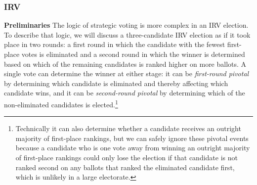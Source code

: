 \documentclass[11pt,a4paper]{article}
\begin{document}
%
%
%
%

\subsubsection{IRV} 

\noindent \textbf{Preliminaries}  The logic of strategic voting is more complex in an IRV election. To describe that logic, we will discuss a three-candidate IRV election as if it took place in two rounds: a first round in which the candidate with the fewest first-place votes is eliminated and a second round in which the winner is determined based on which of the remaining candidates is ranked higher on more ballots. A single vote can determine the winner at either stage: it can be \emph{first-round pivotal} by determining which candidate is eliminated and thereby affecting which candidate wins, and it can be \emph{second-round pivotal} by determining which of the non-eliminated candidates is elected.\footnote{Technically it can also determine whether a candidate receives an outright majority of first-place rankings, but we can safely ignore these pivotal events because a candidate who is one vote away from winning an outright majority of first-place rankings could only lose the election if that candidate is not ranked second on any ballots that ranked the eliminated candidate first, which is unlikely in a large electorate.} 
\end{document}
